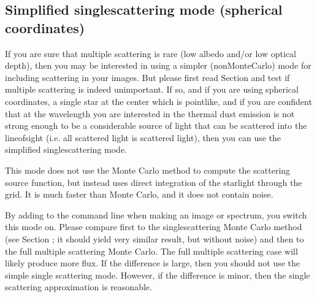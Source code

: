 \documentclass[letterpaper,10pt,english]{sphinxmanual}
\begin{document}
\subsection{Simplified single\sphinxhyphen{}scattering mode (spherical coordinates)}
\label{\detokenize{dustradtrans:simplified-single-scattering-mode-spherical-coordinates}}\label{\detokenize{dustradtrans:sec-simple-single-scattering}}
If you are sure that multiple scattering is rare (low albedo and/or low optical
depth), then you may be interested in using a simpler (non\sphinxhyphen{}Monte\sphinxhyphen{}Carlo) mode for
including scattering in your images.  But please first read Section
{\hyperref[\detokenize{dustradtrans:sec-single-multiple-scattering}]{}} and test if multiple scattering is indeed
unimportant. If so, and if you are using spherical coordinates, a single star at
the center which is point\sphinxhyphen{}like, and if you are confident that at the wavelength
you are interested in the thermal dust emission is not strong enough to be a
considerable source of light that can be scattered into the line\sphinxhyphen{}of\sphinxhyphen{}sight
(i.e. all scattered light is scattered  light), then you can use the
simplified single\sphinxhyphen{}scattering mode.

This mode does not use the Monte Carlo method to compute the scattering source
function, but instead uses direct integration of the starlight through the
grid. It is much faster than Monte Carlo, and it does not contain noise.

By adding  to the command line when making an image or spectrum,
you switch this mode on. Please compare first to the single\sphinxhyphen{}scattering Monte
Carlo method (see Section {\hyperref[\detokenize{dustradtrans:sec-single-multiple-scattering}]{}}; it should yield
very similar result, but without noise) and then to the full multiple scattering
Monte Carlo. The full multiple scattering case will likely produce more flux. If
the difference is large, then you should not use the simple single scattering
mode. However, if the difference is minor, then the single scattering
approximation is reasonable.
\end{document}
